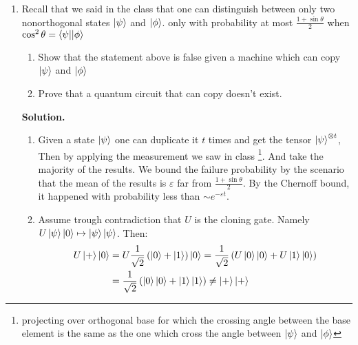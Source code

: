 \documentclass[12pt,a4paper]{article}
\begin{document}
\begin{enumerate}
    \item Recall that we said in the class that one can distinguish between only two nonorthogonal states $\ket{\psi}$ and $\ket{\phi}$. only with probability at most $ \frac{1 + \sin \theta}{2}$ when $\cos ^{2}\theta = \braket{\psi|| \phi} $

    \begin{enumerate}
        \item Show that the statement above is false given a machine which can copy $\ket{\psi}$ and $\ket{\phi}$
        \item  Prove that a quantum circuit that can copy doesn't exist. 
    \end{enumerate}

    \textbf{Solution.} \begin{enumerate}
        \item Given a state $\ket{\psi}$ one can duplicate it $t$ times and get the tensor $\ket{\psi}^{ \otimes t}$, Then by applying the measurement we saw in class \footnote{projecting over orthogonal base for which the crossing angle between the base element is the same as the one which cross the angle between $\ket{\psi}$ and $\ket{\phi}$}. And take the majority of the results. We bound the failure probability by the scenario that the mean of the results is $\varepsilon$ far from $\frac{1 + \sin\theta}{2}$. By the Chernoff bound, it happened with probability less than $\sim e^{-\varepsilon t}$.
        
        \item  Assume trough contradiction that $U$ is the cloning gate. Namely $U \ket{\psi} \ket{0} \mapsto \ket{\psi} \ket{\psi} $. Then:
        \begin{equation*}
        \begin{split}
            U\ket{+}\ket{0} &=  U\frac{1}{\sqrt{2}}\left(\ket{0} + \ket{1} \right) \ket{0} =  \frac{1}{\sqrt{2}}\left(U\ket{0}\ket{0} + U\ket{1}\ket{0} \right) \\ &=\frac{1}{\sqrt{2}}\left(\ket{0}\ket{0} + \ket{1}\ket{1} \right) \neq \ket{+}\ket{+} 
            \end{split}
        \end{equation*}
    \end{enumerate}

    
    

\end{enumerate}
\end{document}
